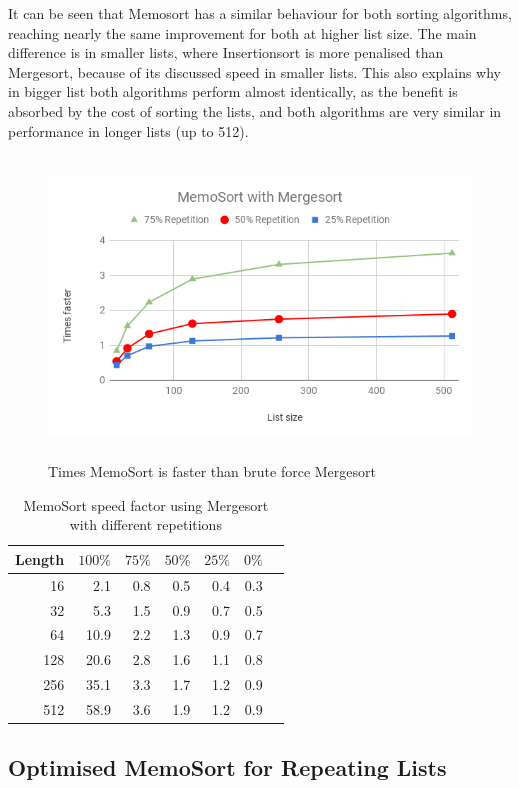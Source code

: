\documentclass[a4paper,12pt]{article}
\begin{document}
It can be seen that Memosort has a similar behaviour for both sorting algorithms, reaching nearly the same improvement for both at higher list size. The main difference is in smaller lists, where Insertionsort is more penalised than Mergesort, because of its discussed speed in smaller lists. This also explains why in bigger list both algorithms perform almost identically, as the benefit is absorbed by the cost of sorting the lists, and both algorithms are very similar in performance in longer lists (up to 512).
\begin{figure}[H]
    \centering
    \includegraphics[height=8cm,keepaspectratio]{./images/MemoSortMerge.png}
    \caption{Times MemoSort is faster than brute force Mergesort }
    \label{fig:MemoSortMergeGraph}
\end{figure}


\begin{table}[H]
\centering
\begin{tabular}{|r|r|r|r|r|r|r|}   \hline
	{Length} &  {$100\%$} & {$75\%$} & {$50\%$} & {$25\%$} & {$0\%$} \\  \hline
	16 & 2.1&0.8 & 0.5 & 0.4 &0.3\\ 
	32 & 5.3&1.5 & 0.9&0.7& 0.5\\ 
	64 & 10.9 &2.2&1.3&0.9&0.7\\ 
	128 & 20.6&2.8&1.6&1.1&0.8\\ 
	256 & 35.1&3.3&1.7&1.2&0.9\\ 
	512 &  58.9&3.6&1.9&1.2&0.9\\  \hline
\end{tabular}
\caption{MemoSort speed factor using Mergesort with different repetitions}
\label{fig:MemoSortMergeTable}
\end{table}

\subsection{Optimised MemoSort for Repeating Lists}
\end{document}
